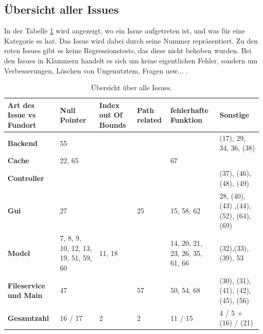 \documentclass[parskip=full]{scrartcl}
\begin{document}
\subsection{Übersicht aller Issues}
In der Tabelle \ref{issueOverView} wird angezeigt, wo ein Issue aufgetreten ist, und was für eine Kategorie es hat. Das Issue wird dabei durch seine Nummer repräsentiert. Zu den roten Issues gibt es keine Regressionstests, das diese nicht behoben wurden. Bei den Issues in Klammern handelt es sich um keine eigentlichen Fehler, sondern um Verbesserungen, Löschen von Ungenutztem, Fragen usw... .

\begin{table}[h]
\begin{tabular}{| p{3cm} | p{} | p{}  |p{} |p{} |p{}|}
	\hline
	\textbf{Art des Issue vs Fundort} & \textbf{Null Pointer} & \textbf{Index out Of Bounds} & \textbf{Path related} & \textbf{fehlerhafte Funktion} & \textbf{Sonstige} \\ \hline
	\textbf{Backend}
	& 
	\textcolor[rgb]{1,0,0}{55}
	&
	
	&
	
	&
	
	&
	\textcolor[rgb]{1,0,0}{(17)}, 29, 34, 36, (38)
	\\ \hline
	
	\textbf{Cache}
	& 
	22, 65
	&
		
	&
	&
	67
	&
	\\ \hline
	
	\textbf{Controller}
	& 
	
	&

	&
	&
	&
	(37), \textcolor[rgb]{1,0,0}{(46)},(48), (49)
	\\ \hline
	\textbf{Gui}
	& 
	27
	&
	&
	25
	
	&
	15, 58, 62
	&
	\textcolor[rgb]{1,0,0}{28}, (40),\textcolor[rgb]{1,0,0}{(43) },\textcolor[rgb]{1,0,0}{(44)}, (52), (64), \textcolor[rgb]{1,0,0}{(69)}
	\\ \hline
	
	\textbf{Model}
	& 
	7, 8, 9, 10, 12, 13, 19, 51, 59, 60
	&
	11, 18
	&	
	
	&
	14, \textcolor[rgb]{1,0,0}{20}, 21, 23, \textcolor[rgb]{1,0,0}{26}, 35, \textcolor[rgb]{1,0,0}{61}, 66
	&
	(32),(33), (39), 53
	\\ \hline
	
	\textbf{Fileservice und Main}
	& 
	47
	&
	
	&
	57
	&
	50, 54, \textcolor[rgb]{1,0,0}{68}
	&
	(30), (31), (41), (42), (45), (56)	
	\\ \hline

	\textbf{Gesamtzahl}
	&
	16 / 17
	&
	2
	&
	2
	&
	11 / 15
	&
	4 / 5 + (16) / (21) 
	\\ \hline
	
\end{tabular}
\caption{Übersicht über alle Issues.}
\label{issueOverView}
\end{table}
\end{document}
